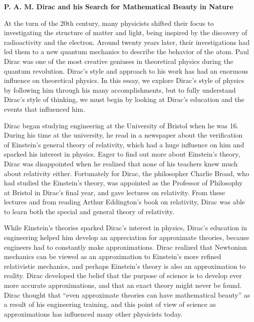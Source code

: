 \documentclass[12pt, oneside, letterpaper, fleqn]{article}
\begin{document}
\begin{center}
\textbf{P. A. M. Dirac and his Search for Mathematical Beauty in Nature}
\end{center}

At the turn of the 20th century, many physicists shifted their focus to
investigating the structure of matter and light, being inspired by the
discovery of radioactivity and the electron. Around twenty years later,
their investigations had led them to a new quantum mechanics to describe
the behavior of the atom.  Paul Dirac was one of the most creative
geniuses in theoretical physics during the quantum revolution. Dirac's
style and approach to his work has had an enormous influence on
theoretical physics. In this essay, we explore Dirac's style of physics
by following him through his many accomplishments, but to fully
understand Dirac's style of thinking, we must begin by looking at
Dirac's education and the events that influenced him.

Dirac began studying engineering at the University of Bristol when he
was 16. During his time at the university, he read in a newspaper about
the verification of Einstein's general theory of relativity, which had a
huge influence on him and sparked his interest in physics. Eager to find
out more about Einstein's theory, Dirac was disappointed when he
realized that none of his teachers knew much about relativity either.
Fortunately for Dirac, the philosopher Charlie Broad, who had studied
the Einstein's theory, was appointed as the Professor of Philosophy at
Bristol in Dirac's final year, and gave lectures on relativity. From
these lectures and from reading Arthur Eddington's book on relativity,
Dirac was able to learn both the special and general theory of
relativity.

While Einstein's theories sparked Dirac's interest in physics, Dirac's
education in engineering helped him develop an appreciation for
approximate theories, because engineers had to constantly make
approximations. Dirac realized that Newtonian mechanics can be viewed as
an approximation to Einstein's more refined relativistic mechanics, and
perhaps Einstein's theory is also an approximation to reality. Dirac
developed the belief that the purpose of science is to develop ever more
accurate approximations, and that an exact theory might never be found.
Dirac thought that ``even approximate theories can have mathematical
beauty'' \cite[pg. 45]{strangest_man} as a result of his engineering
training, and this point of view of science as approximations has
influenced many other physicists today.
\end{document}

